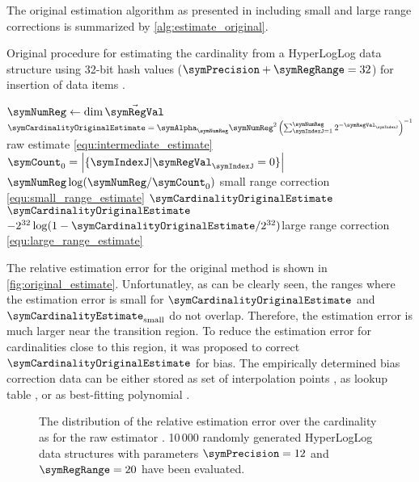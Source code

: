 \documentclass[a4paper]{scrartcl}
\begin{document}
The original estimation algorithm as presented in \cite{Flajolet2007} including small and large range corrections is summarized by \cref{alg:estimate_original}. 
\begin{algorithm}
\caption{Original procedure for estimating the cardinality from a  HyperLogLog data structure using 32-bit hash values ($\symPrecision+\symRegRange = 32$) for insertion of data items \cite{Flajolet2007}.}
\label{alg:estimate_original}
\begin{algorithmic}
\State $\symNumReg \gets \dim \vec{\symRegVal}$
\State $\symCardinalityOriginalEstimate = \symAlpha_\symNumReg \symNumReg^2\left(\sum_{\symIndexJ=1}^\symNumReg 2^{-\symRegVal_\symIndexJ}\right)^{-1}$
\Comment raw estimate \eqref{equ:intermediate_estimate}
\State $\symCount_0 = \left|\{\symIndexJ |\symRegVal_\symIndexJ=0\}\right|$
\State \Return $\symNumReg \log(\symNumReg / \symCount_0)$ \Comment small range correction \eqref{equ:small_range_estimate}
\Else
\State \Return $\symCardinalityOriginalEstimate$
\EndIf
{}
\State \Return $\symCardinalityOriginalEstimate$
\Else
\State\Return $-2^{32}\log(1-\symCardinalityOriginalEstimate/2^{32})$\Comment large range correction \eqref{equ:large_range_estimate}
\EndIf
\EndFunction
\end{algorithmic}
\end{algorithm}
The relative estimation error for the original method is shown in \cref{fig:original_estimate}. Unfortunatley, as can be clearly seen, the ranges where the estimation error is small for $\symCardinalityOriginalEstimate$ and $\symCardinalityEstimate_\text{small}$ do not overlap. Therefore, the estimation error is much larger near the transition region. To reduce the estimation error for cardinalities close to this region, it was proposed to correct $\symCardinalityOriginalEstimate$ for bias. The empirically determined bias correction data can be either stored as set of interpolation points \cite{Heule2013}, as lookup table \cite{Rhodes2015}, or as best-fitting polynomial \cite{Sanfilippo2014}. 

\begin{figure}
\centering

\caption{The distribution of the relative estimation error over the cardinality as for the raw estimator \cite{Flajolet2007}. 10\,000 randomly generated HyperLogLog data structures with parameters $\symPrecision = 12$ and $\symRegRange=20$ have been evaluated.}
\label{fig:raw_estimate}
\end{figure}
\end{document}
